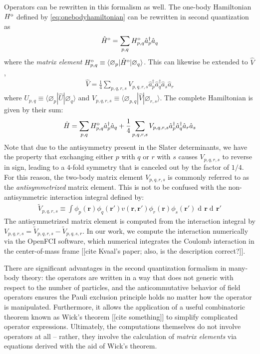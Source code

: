 \documentclass[amsmath, amssymb, aps, floatfix, nofootinbib, preprintnumbers,showpacs, superscriptaddress, twocolumn]{revtex4-1}
\newcommand{\D}{\operatorname{d\!}}
\newcommand{\ket}[1]{| #1 \rangle}
\newcommand{\bra}[1]{\langle #1 |}
\begin{document}
Operators can be rewritten in this formalism as well.  The one-body
Hamiltonian $H^{\text o}$ defined by \eqref{eq:onebodyhamiltonian} can be
rewritten in second quantization as
\begin{align} \label{eq:second_quantized_one_body_hamiltonian}
  \hat H^{\text o} = \sum_{p, q} H_{p, q}^{\text o} \hat a_p^\dagger \hat a_q^{}
\end{align}
where the \textit{matrix element}
$H_{p, q}^{\text o} \equiv \bra{\varnothing_p} \hat H^{\text o} \ket{\varnothing_q}$.  This
can likewise be extended to $\hat V$,
\begin{align} \label{eq:second_quantized_two_body_hamiltonian}
  \hat V = \frac{1}{4} \sum_{p, q, r, s} V_{p, q, r, s}^{}
  \hat a_p^\dagger \hat a_q^\dagger \hat a_s^{} \hat a_r^{}
\end{align}
where $U_{p, q} \equiv \langle \varnothing_p | \hat U | \varnothing_q \rangle$ and
$V_{p, q, r, s} \equiv \langle \varnothing_{p, q} | \hat V | \varnothing_{r, s} \rangle$.
The complete Hamiltonian is given by their sum:
\begin{align}
  \hat{H} = \sum_{p, q} H^{\text o}_{p, q} \hat{a}_p^\dagger \hat{a}_q + \frac{1}{4} \sum_{p, q, r, s} V_{p, q, r, s} \hat{a}_p^\dagger \hat{a}_q^\dagger \hat{a}_r \hat{a}_s  \label{eq:vacuumhamiltonian}
\end{align}
Note that due to the antisymmetry present in the Slater determinants, we have
the property that exchanging either $p$ with $q$ or $r$ with $s$ causes
$V_{p, q, r, s}$ to reverse in sign, leading to a $4$-fold symmetry that is
canceled out by the factor of $1/4$.  For this reason, the two-body matrix
element $V_{p, q, r, s}$ is commonly referred to as the \emph{antisymmetrized}
matrix element.  This is not to be confused with the non-antisymmetric
interaction integral defined by:
\begin{align*}
  \tilde V_{p, q, r, s} \equiv \int \phi_p(\bm r) \phi_q(\bm r') v(\bm r, \bm r') \phi_r(\bm r) \phi_s(\bm r') \D \bm r \D \bm r'
\end{align*}
The antisymmetrized matrix element is computed from the interaction integral
by $V_{p, q, r, s} = \tilde V_{p, q, r, s} - \tilde V_{p, q, s, r}$.  In our
work, we compute the interaction numerically via the OpenFCI software, which
numerical integrates the Coulomb interaction in the center-of-mass frame
[[cite Kvaal's paper; also, is the description correct?]].

There are significant advantages in the second quantization formalism in
many-body theory: the operators are written in a way that does not generic
with respect to the number of particles, and the anticommutative behavior of
field operators ensures the Pauli exclusion principle holds no matter how the
operator is manipulated.  Furthermore, it allows the application of a useful
combinatoric theorem known as Wick's theorem [[cite something]] to simplify
complicated operator expressions.  Ultimately, the computations themselves do
not involve operators at all -- rather, they involve the calculation of
\emph{matrix elements} via equations derived with the aid of Wick's theorem.
\end{document}
